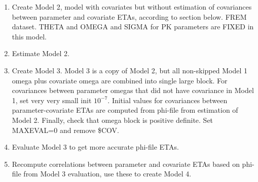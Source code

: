 \begin{enumerate}
\item Create Model 2, model with covariates but without
estimation of covariances between parameter and covariate ETAs,
according to section below. FREM dataset.
THETA and OMEGA and SIGMA for PK parameters are FIXED in this model.
\item Estimate Model 2.
\item Create Model 3.
Model 3 is a copy of Model 2, but all non-skipped Model 1 omega plus covariate omega are combined
into single large block. For covariances between parameter omegas that did
not have covariance in Model 1, set very very small init $10^{-7}$.
Initial values for covariances between parameter-covariate ETAs are computed from
phi-file from estimation of Model 2. Finally, check that omega block is positive definite.
Set MAXEVAL=0 and remove \$COV.
\item Evaluate Model 3 to get more accurate phi-file ETAs.
\item Recompute correlations
between parameter and covariate ETAs based on phi-file from Model 3 evaluation,
use these to create Model 4.


\end{enumerate}
